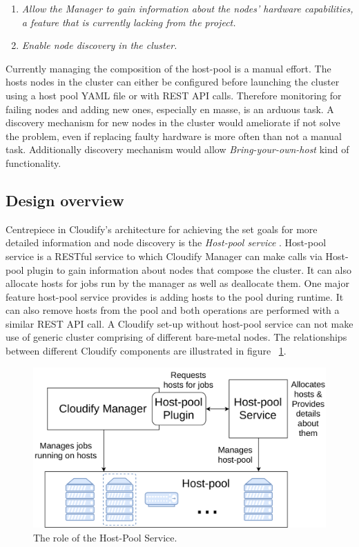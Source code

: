 \begin{enumerate}
\item \textit{Allow the Manager to gain information about the nodes' hardware capabilities, a feature that is currently lacking from the project.}
\item \textit{Enable node discovery in the cluster.}
\end{enumerate}

Currently managing the composition of the host-pool is a manual effort. The hosts nodes in the cluster can either be configured before launching the cluster using a host pool YAML file or with REST API calls. Therefore monitoring for failing nodes and adding new ones, especially en masse, is an arduous task. A discovery mechanism for new nodes in the cluster would ameliorate if not solve the problem, even if replacing faulty hardware is more often than not a manual task. Additionally discovery mechanism would allow \textit{Bring-your-own-host} kind of functionality.

 \subsection{Design overview}
 
Centrepiece in Cloudify's architecture for achieving the set goals for more detailed information and node discovery is the \textit{Host-pool service} \cite{host-pool-service}. Host-pool service is a RESTful service to which Cloudify Manager can make calls via Host-pool plugin to gain information about nodes that compose the cluster. It can also allocate hosts for jobs run by the manager as well as deallocate them. One major feature host-pool service provides is adding hosts to the pool during runtime. It can also remove hosts from the pool and both operations are performed with a similar REST API call. A Cloudify set-up without host-pool service can not make use of generic cluster comprising of different bare-metal nodes. The relationships between different Cloudify components are illustrated in figure ~\ref{fig:cloudify_roles}.
 
 \begin{figure}[ht!]
\centering
  \includegraphics[width=\textwidth, keepaspectratio]{Cloudify_roles.png}%
  \caption{The role of the Host-Pool Service.}
  \label{fig:cloudify_roles}
\end{figure}

